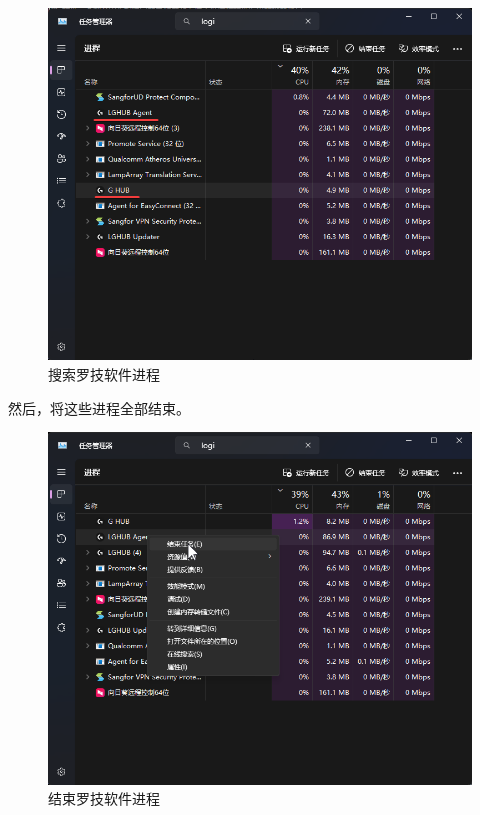 \begin{figure}[H]
    \Centering
    \includegraphics[width=\textwidth]{docs/assets/search_lghub_process.png}
    \caption{搜索罗技软件进程}
\end{figure}

然后，将这些进程全部结束。

\begin{figure}[H]
    \Centering
    \includegraphics[width=\textwidth]{docs/assets/terminate_lghub_00.png}
    \caption{结束罗技软件进程}
\end{figure}


